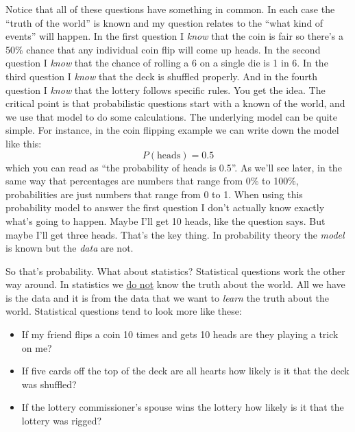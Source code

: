 Notice that all of these questions have something in common. In each case the ``truth of the world'' is known and my question relates to the ``what kind of events'' will happen. In the first question I {\it know} that the coin is fair so there's a 50\% chance that any individual coin flip will come up heads. In the second question I {\it know} that the chance of rolling a 6 on a single die is 1 in 6. In the third question I {\it know} that the deck is shuffled properly. And in the fourth question I {\it know} that the lottery follows specific rules. You get the idea. The critical point is that probabilistic questions start with a known  of the world, and we use that model to do some calculations. The underlying model can be quite simple. For instance, in the coin flipping example we can write down the model like this:
$$
P(\mbox{heads}) = 0.5
$$
which you can read as ``the probability of heads is 0.5''. As we'll see later, in the same way that percentages are numbers that range from 0\% to 100\%, probabilities are just numbers that range from 0 to 1. When using this probability model to answer the first question I don't actually know exactly what's going to happen. Maybe I'll get 10 heads, like the question says. But maybe I'll get three heads. That's the key thing. In probability theory the {\it model} is known but the {\it data} are not.

So that's probability. What about statistics? Statistical questions work the other way around. In statistics we \underline{do not} know the truth about the world. All we have is the data and it is from the data that we want to {\it learn} the truth about the world. Statistical questions tend to look more like these:
\begin{itemize} \itemsep -2pt
\item If my friend flips a coin 10 times and gets 10 heads are they playing a trick on me?
\item If five cards off the top of the deck are all hearts how likely is it that the deck was shuffled? 
\item If the lottery commissioner's spouse wins the lottery how likely is it that the lottery was rigged?
\end{itemize}

